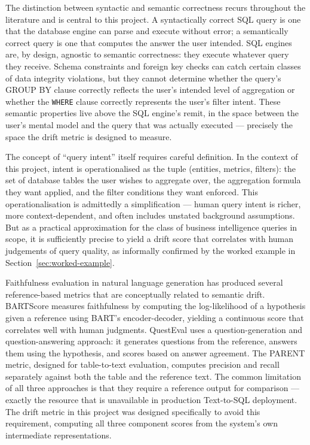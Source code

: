 \documentclass[12pt,a4paper]{report}
\begin{document}
The distinction between syntactic and semantic correctness recurs throughout the literature and is central to this project. A syntactically correct \ac{SQL} query is one that the database engine can parse and execute without error; a semantically correct query is one that computes the answer the user intended. SQL engines are, by design, agnostic to semantic correctness: they execute whatever query they receive. Schema constraints and foreign key checks can catch certain classes of data integrity violations, but they cannot determine whether the query's GROUP BY clause correctly reflects the user's intended level of aggregation or whether the \texttt{WHERE} clause correctly represents the user's filter intent. These semantic properties live above the SQL engine's remit, in the space between the user's mental model and the query that was actually executed — precisely the space the drift metric is designed to measure.

The concept of ``query intent'' itself requires careful definition. In the context of this project, intent is operationalised as the tuple (entities, metrics, filters): the set of database tables the user wishes to aggregate over, the aggregation formula they want applied, and the filter conditions they want enforced. This operationalisation is admittedly a simplification — human query intent is richer, more context-dependent, and often includes unstated background assumptions. But as a practical approximation for the class of business intelligence queries in scope, it is sufficiently precise to yield a drift score that correlates with human judgements of query quality, as informally confirmed by the worked example in Section~\ref{sec:worked-example}.

Faithfulness evaluation in natural language generation has produced several reference-based metrics that are conceptually related to semantic drift. BARTScore measures faithfulness by computing the log-likelihood of a hypothesis given a reference using BART's encoder-decoder, yielding a continuous score that correlates well with human judgments. QuestEval uses a question-generation and question-answering approach: it generates questions from the reference, answers them using the hypothesis, and scores based on answer agreement. The PARENT metric, designed for table-to-text evaluation, computes precision and recall separately against both the table and the reference text. The common limitation of all three approaches is that they require a reference output for comparison — exactly the resource that is unavailable in production Text-to-SQL deployment. The drift metric in this project was designed specifically to avoid this requirement, computing all three component scores from the system's own intermediate representations.
\end{document}

